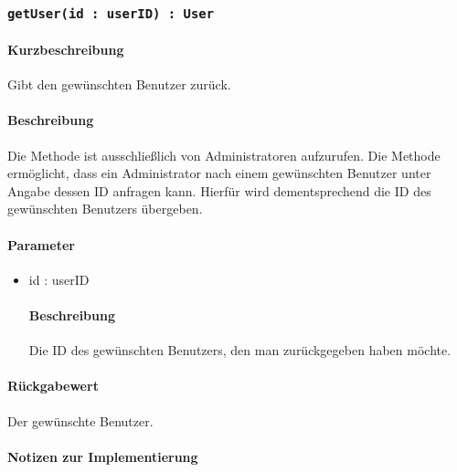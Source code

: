 \subsubsection{\texttt{getUser(id : userID) : User}}%
\paragraph*{Kurzbeschreibung}
Gibt den gewünschten Benutzer zurück.
\paragraph*{Beschreibung}
Die Methode ist ausschließlich von Administratoren aufzurufen.
Die Methode ermöglicht, dass ein Administrator nach einem gewünschten Benutzer unter Angabe dessen ID anfragen kann.
Hierfür wird dementsprechend die ID des gewünschten Benutzers übergeben.
\paragraph*{Parameter}
\begin{itemize}
    \item id : userID
    		\paragraph*{Beschreibung}
    		Die ID des gewünschten Benutzers, den man zurückgegeben haben möchte.
\end{itemize}
\paragraph*{Rückgabewert}
Der gewünschte Benutzer.

\paragraph*{Notizen zur Implementierung}%
